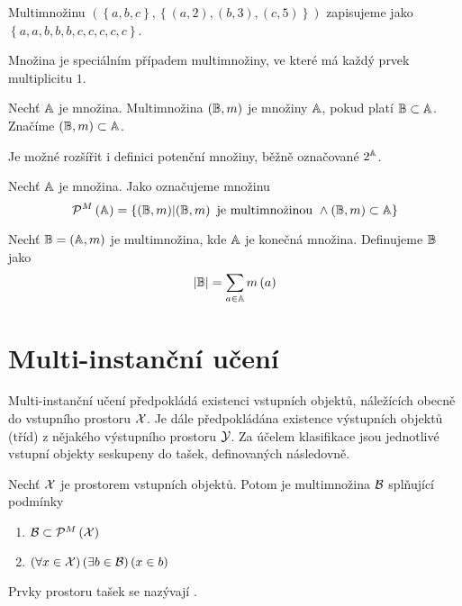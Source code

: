 \begin{example}
	Multimnožinu \( \left( \left\{ a, b, c \right\}, \left\{ \left( a, 2 \right), \left( b, 3 \right), \left( c, 5 \right) \right\} \right) \) zapisujeme jako \( \left\{ a, a, b, b, b, c, c, c, c, c \right\} \).
\end{example}

\begin{remark}
	Množina je speciálním případem multimnožiny, ve které má každý prvek multiplicitu \( 1 \).
\end{remark}

\begin{define}
	Nechť \( \mathbb A \) je množina. Multimnožina \( \left( \mathbb B, m \right) \) je  množiny \( \mathbb A \), pokud platí \( \mathbb B \subset \mathbb A \). Značíme \( \left( \mathbb B, m \right) \subset \mathbb A \).
\end{define}

Je možné rozšířit i definici potenční množiny, běžně označované \( 2^{\mathbb A} \).

\begin{define}
	Nechť \( \mathbb A \) je množina. Jako  označujeme množinu
	\[ \mathcal P^M \left( \mathbb A \right) = \left\{ \left( \mathbb B, m \right) \middle| \left( \mathbb B, m \right) \text{ je multimnožinou } \land \left( \mathbb B, m \right) \subset \mathbb A \right\} \]
\end{define}

\begin{define}
	Nechť \( \mathbb B = \left( \mathbb A, m \right) \) je multimnožina, kde \( \mathbb A \) je konečná množina. Definujeme  \( \mathbb B \) jako
	\[ \left| \mathbb B \right| = \sum_{a \in \mathbb A} m \left( a \right) \]
\end{define}

\section{Multi-instanční učení}

Multi-instanční učení předpokládá existenci vstupních objektů, náležících obecně do vstupního prostoru \( \mathcal X \). Je dále předpokládána existence výstupních objektů (tříd) z nějakého výstupního prostoru \( \mathcal Y \). Za účelem klasifikace jsou jednotlivé vstupní objekty seskupeny do tašek, definovaných následovně.

\begin{define}
	Nechť \( \mathcal X \) je prostorem vstupních objektů. Potom  je multimnožina \( \mathcal B \) splňující podmínky
	\begin{enumerate}
		\item \( \mathcal B \subset \mathcal P^M \left( \mathcal X \right) \)
		\item \( \left( \forall x \in \mathcal X \right) \left( \exists b \in \mathcal B \right) \left( x \in b \right) \)
	\end{enumerate}
	Prvky prostoru tašek se nazývají .
\end{define}

